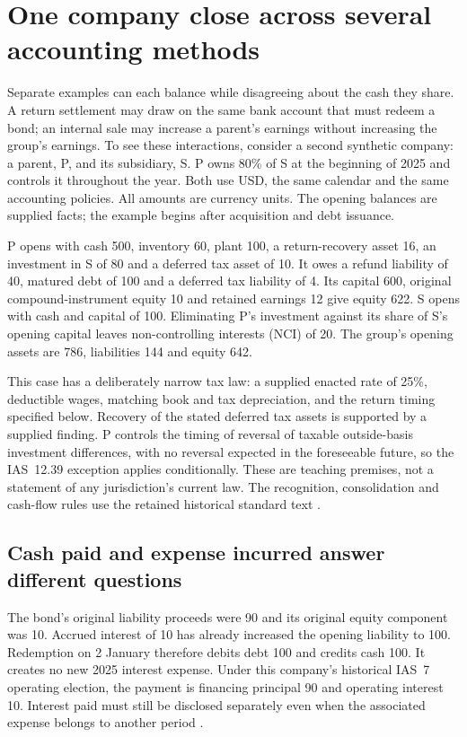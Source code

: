 \section{One company close across several accounting methods}
\label{sec:company-composition}

Separate examples can each balance while disagreeing about the cash they share.
A return settlement may draw on the same bank account that must redeem a bond;
an internal sale may increase a parent's earnings without increasing the group's
earnings. To see these interactions, consider a second synthetic company: a
parent, P, and its subsidiary, S. P owns 80\% of S at the beginning of 2025 and
controls it throughout the year. Both use USD, the same calendar and the same
accounting policies. All amounts are currency units. The opening balances are
supplied facts; the example begins after acquisition and debt issuance.

P opens with cash 500, inventory 60, plant 100, a return-recovery asset 16, an
investment in S of 80 and a deferred tax asset of 10. It owes a refund liability
of 40, matured debt of 100 and a deferred tax liability of 4. Its capital 600,
original compound-instrument equity 10 and retained earnings 12 give equity
622. S opens with cash and capital of 100. Eliminating P's investment against
its share of S's opening capital leaves non-controlling interests (NCI) of 20.
The group's opening assets are 786, liabilities 144 and equity 642.

This case has a deliberately narrow tax law: a supplied enacted rate of 25\%,
deductible wages, matching book and tax depreciation, and the return timing
specified below. Recovery of the stated deferred tax assets is supported by a
supplied finding. P controls the timing of reversal of taxable outside-basis
investment differences, with no reversal expected in the foreseeable future,
so the IAS~12.39 exception applies conditionally. These are teaching premises,
not a statement of any jurisdiction's current law. The recognition,
consolidation and cash-flow rules use the retained historical standard text
\citep[IAS~12.24,39,46--51; IFRS~10.B86--B94]{eu20231803}.

\subsection{Cash paid and expense incurred answer different questions}

The bond's original liability proceeds were 90 and its original equity component
was 10. Accrued interest of 10 has already increased the opening liability to
100. Redemption on 2 January therefore debits debt 100 and credits cash 100.
It creates no new 2025 interest expense. Under this company's historical IAS~7
operating election, the payment is financing principal 90 and operating interest
10. Interest paid must still be disclosed separately even when the associated
expense belongs to another period \citep[IAS~7.31--33]{eu20231803}.

